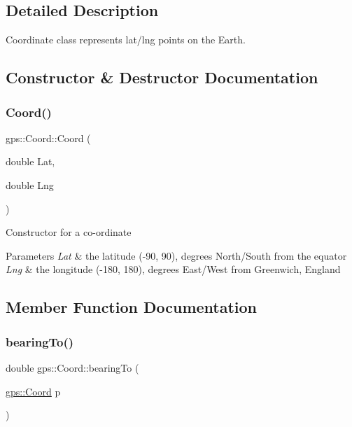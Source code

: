 \subsection{Detailed Description}
Coordinate class represents lat/lng points on the Earth. 

\subsection{Constructor \& Destructor Documentation}
\mbox{\label{classgps_1_1Coord_afcc45fae837b48cd7d9bd545c4dc574c}} 
\subsubsection{\texorpdfstring{Coord()}{Coord()}}
{\footnotesize\ttfamily gps\+::\+Coord\+::\+Coord (\begin{DoxyParamCaption}\item[{double}]{Lat,  }\item[{double}]{Lng }\end{DoxyParamCaption})}

Constructor for a co-\/ordinate 
\begin{DoxyParams}{Parameters}
{\em Lat} & the latitude (-\/90, 90), degrees North/\+South from the equator \\
\hline
{\em Lng} & the longitude (-\/180, 180), degrees East/\+West from Greenwich, England \\
\hline
\end{DoxyParams}


\subsection{Member Function Documentation}
\mbox{\label{classgps_1_1Coord_a3d3d160c28334979d220dce4112e087d}} 
\subsubsection{\texorpdfstring{bearing\+To()}{bearingTo()}}
{\footnotesize\ttfamily double gps\+::\+Coord\+::bearing\+To (\begin{DoxyParamCaption}\item[{\hyperlink{classgps_1_1Coord}{gps\+::\+Coord}}]{p }\end{DoxyParamCaption})}

